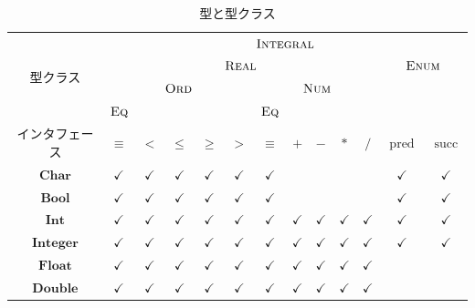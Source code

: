 \documentclass[a4paper,twocolumn]{jsbook}
\DeclareMathOperator{\mPred}{pred}
\DeclareMathOperator{\mSucc}{succ}
\newcommand{\mType}[1]{\mathbf{#1}}
\newcommand{\mBoolType}{\mType{Bool}}
\newcommand{\mCharType}{\mType{Char}}
\newcommand{\mFloatType}{\mType{Float}}
\newcommand{\mDoubleType}{\mType{Double}}
\newcommand{\mIntType}{\mType{Int}}
\newcommand{\mIntegerType}{\mType{Integer}}
\newcommand{\mSpecialTypeClass}[1]{\textsc{#1}} %
\newcommand{\mEnumTypeClass}{\mSpecialTypeClass{Enum}}
\newcommand{\mEqTypeClass}{\mSpecialTypeClass{Eq}}
\newcommand{\mIntegralTypeClass}{\mSpecialTypeClass{Integral}}
\newcommand{\mNumTypeClass}{\mSpecialTypeClass{Num}}
\newcommand{\mOrdTypeClass}{\mSpecialTypeClass{Ord}}
\newcommand{\mRealTypeClass}{\mSpecialTypeClass{Real}}
\begin{document}
\begin{table}
\caption{型と型クラス}
\label{tab:type-and-typeclass}
\begin{center}
\begin{tabular}{||c||c|c|c|c|c|c|c|c|c|c|c|c||}
\hline
\multirow{4}{*}{型クラス}
    &\multicolumn{12}{|c||}{$\mIntegralTypeClass$}\\
\cline{2-13}
\multirow{3}{*}{}
    &\multicolumn{10}{|c|}{$\mRealTypeClass$}
    &\multicolumn{2}{|c||}{$\mEnumTypeClass$}\\
\cline{2-11}
\multirow{2}{*}{}
    &\multicolumn{5}{|c|}{$\mOrdTypeClass$}
    &\multicolumn{5}{|c|}{$\mNumTypeClass$}
    &\multicolumn{2}{|c||}{ }\\
\cline{2-2}\cline{7-7}
{ }
    &$\mEqTypeClass$
    &\multicolumn{4}{|c|}{ }
    &$\mEqTypeClass$
    &\multicolumn{4}{|c|}{ }
    &\multicolumn{2}{|c||}{ }\\
\hline
インタフェース
    &$\equiv$
    &$<$
    &$\le$
    &$\ge$
    &$>$
    &$\equiv$
    &$+$
    &$-$
    &$*$
    &$/$
    &$\mPred$
    &$\mSucc$\\
\hline\hline
$\mCharType$
    &$\checkmark$
    &$\checkmark$
    &$\checkmark$
    &$\checkmark$
    &$\checkmark$
    &$\checkmark$
    &
    &
    &
    &
    &$\checkmark$
    &$\checkmark$\\
\hline
$\mBoolType$
    &$\checkmark$
    &$\checkmark$
    &$\checkmark$
    &$\checkmark$
    &$\checkmark$
    &$\checkmark$
    &
    &
    &
    &
    &$\checkmark$
    &$\checkmark$\\
\hline
$\mIntType$
    &$\checkmark$
    &$\checkmark$
    &$\checkmark$
    &$\checkmark$
    &$\checkmark$
    &$\checkmark$
    &$\checkmark$
    &$\checkmark$
    &$\checkmark$
    &$\checkmark$
    &$\checkmark$
    &$\checkmark$\\
\hline
$\mIntegerType$
    &$\checkmark$
    &$\checkmark$
    &$\checkmark$
    &$\checkmark$
    &$\checkmark$
    &$\checkmark$
    &$\checkmark$
    &$\checkmark$
    &$\checkmark$
    &$\checkmark$
    &$\checkmark$
    &$\checkmark$\\
\hline
$\mFloatType$
    &$\checkmark$
    &$\checkmark$
    &$\checkmark$
    &$\checkmark$
    &$\checkmark$
    &$\checkmark$
    &$\checkmark$
    &$\checkmark$
    &$\checkmark$
    &$\checkmark$
    &
    &\\
\hline
$\mDoubleType$
    &$\checkmark$
    &$\checkmark$
    &$\checkmark$
    &$\checkmark$
    &$\checkmark$
    &$\checkmark$
    &$\checkmark$
    &$\checkmark$
    &$\checkmark$
    &$\checkmark$
    &
    &\\
\hline
\end{tabular}
\end{center}
\end{table}
\end{document}
